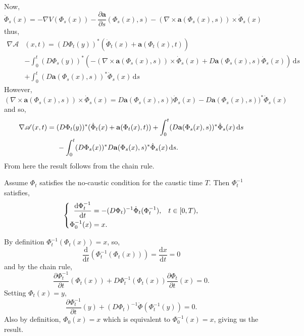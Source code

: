 \documentclass[a4paper,12pt,draft]{report}
\begin{document}
{\begin{align}
\end{align}
Now,
$$
\ddot{\Phi}_s(x) = -\nabla V(\Phi_s(x)) - \frac{\partial \mathbf{a}}{\partial s}(\Phi_s(x), s) - (\nabla \times \mathbf{a}(\Phi_s(x), s))\times\dot{\Phi}_s(x)
$$
thus,
\begin{align}
\nabla\mathscr{A} & (x, t) = (D\Phi_t(y))^*(\dot{\Phi}_t(x) + \mathbf{a}(\Phi_t(x), t))\nonumber\\
& - \int_0^t(D\Phi_s(y))^*(- (\nabla \times \mathbf{a}(\Phi_s(x), s))\times\dot{\Phi}_s(x) + D\mathbf{a}(\Phi_s(x), s)\dot{\Phi}_s(x))\,\mathrm{d}s\nonumber\\
& + \int_0^t(D\mathbf{a}(\Phi_s(x), s))^*\dot{\Phi}_s(x)\,\mathrm{d}s\nonumber
\end{align}
However,
$$
(\nabla\times\mathbf{a}(\Phi_s(x), s))\times\dot{\Phi}_s(x) = D\mathbf{a}(\Phi_s(x), s))\dot{\Phi}_s(x) - D\mathbf{a}(\Phi_s(x), s))^*\dot{\Phi}_s(x)
$$
and so,
\begin{align}
\nabla\mathscr{A}(x, t) & = (D\Phi_t(y))^*(\dot{\Phi}_t(x) + \mathbf{a}(\Phi_t(x), t)) + \int_0^t(D\mathbf{a}(\Phi_s(x), s))^*\dot{\Phi}_s(x)\,\mathrm{d}s\nonumber\\
& \hspace{0.5cm} - \int_0^t(D\Phi_s(x))^*D\mathbf{a}(\Phi_s(x), s)^*\dot{\Phi}_s(x)\,\mathrm{d}s.\nonumber
\end{align}
From here the result follows from the chain rule.

\qedhere
}
\lemma
{
Assume $\Phi_t$ satisfies the no-caustic condition for the caustic time $T$.  Then $\Phi_t^{-1}$ satisfies,
$$
\left\{
\begin{aligned}
\frac{\mathrm{d}\Phi_t^{-1}}{\mathrm{d}t} & = -(D\Phi_t)^{-1}\dot{\Phi}_t(\Phi_t^{-1}), \hspace{0.3cm} t \in [0, T),\\
\Phi_0^{-1}(x) & = x.
\end{aligned}
\right.
$$
}
\proof
{
By definition $\Phi_t^{-1}(\Phi_t(x)) = x$, so,
$$
\frac{\mathrm{d}}{\mathrm{d}t}(\Phi_t^{-1}(\Phi_t(x))) = \frac{\mathrm{d}x}{\mathrm{d}t} = 0
$$
and by the chain rule,
$$
\frac{\partial\Phi_t^{-1}}{\partial t}(\Phi_t(x)) + D\Phi_t^{-1}(\Phi_t(x))\frac{\partial\Phi_t}{\partial t}(x) = 0.
$$
Setting $\Phi_t(x) = y$,
$$
\frac{\partial\Phi_t^{-1}}{\partial t}(y) + (D\Phi_t)^{-1}\dot{\Phi}(\Phi_t^{-1}(y)) = 0.
$$
Also by definition, $\Phi_0(x) = x$ which is equivalent to $\Phi_0^{-1}(x) = x$, giving us the result.

\qedhere
}
\end{document}
